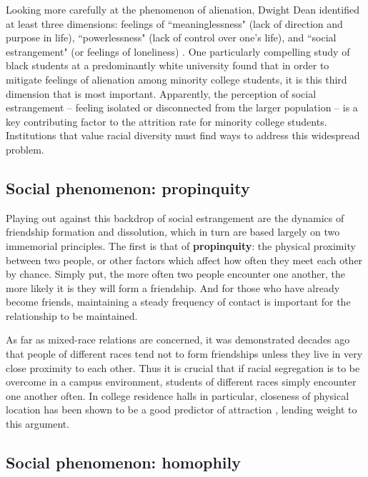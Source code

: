 Looking more carefully at the phenomenon of alienation, Dwight Dean identified
at least three dimensions: feelings of ``meaninglessness" (lack of direction
and purpose in life), ``powerlessness" (lack of control over one's life), and
``social estrangement" (or feelings of loneliness)
\cite{dean_alienation:_1961}. One particularly compelling study of black
students at a predominantly white university \cite{suen_alienation_1983} found
that in order to mitigate feelings of alienation among minority college
students, it is this third dimension that is most important. Apparently, the
perception of social estrangement -- feeling isolated or disconnected from the
larger population -- is a key contributing factor to the attrition rate for
minority college students. Institutions that value racial diversity must find
ways to address this widespread problem.

\subsection{Social phenomenon: propinquity}

Playing out against this backdrop of social estrangement are the dynamics of
friendship formation and dissolution, which in turn are based largely on two
immemorial principles. The first is that of \textbf{propinquity}: the physical
proximity between two people, or other factors which affect how often they
meet each other by chance. Simply put, the more often two people encounter
one another, the more likely it is they will form a friendship. And for those
who have already become friends, maintaining a steady frequency of contact is
important for the relationship to be maintained.

As far as mixed-race relations are concerned, it was demonstrated decades ago
\cite{nahemow_similarity_1975} that people of different races tend not to form
friendships unless they live in very close proximity to each other. Thus it is
crucial that if racial segregation is to be overcome in a campus environment,
students of different races simply encounter one another often. In college
residence halls in particular, closeness of physical location has been shown
to be a good predictor of attraction \cite{priest_proximity_1967}, lending
weight to this argument.

\subsection{Social phenomenon: homophily}

